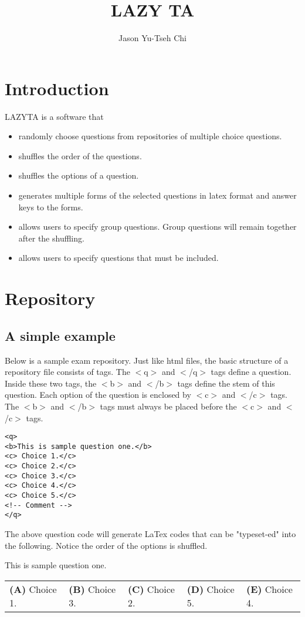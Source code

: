 \documentclass[11pt,letterpaper]{article}
\title{LAZY TA}
\author{Jason Yu-Tseh Chi}
\begin{document}

\section{Introduction}
LAZYTA is a software that 

\begin{itemize}\itemsep0pt
\item randomly choose questions from repositories of multiple choice questions. 
\item shuffles the order of the questions. 
\item shuffles the options of a question. 
\item generates multiple forms of the selected questions in latex format and answer keys to the forms. 
\item allows users to specify group questions. Group questions will remain together after the shuffling. 
\item allows users to specify questions that must be included. 
\end{itemize}

\section{Repository}

\subsection{A simple example}
Below is a sample exam repository. Just like html files, the basic structure of a repository file consists of tags. The $<$q$>$ and $<$/q$>$ tags define a question. Inside these two tags, the $<$b$>$ and $<$/b$>$ tags define the stem of this question. Each option of the question is enclosed by $<$c$>$ and $<$/c$>$ tags. The $<$b$>$ and $<$/b$>$ tags must always be placed before the $<$c$>$ and $<$/c$>$ tags. 

\begin{verbatim}
<q> 
<b>This is sample question one.</b>
<c> Choice 1.</c>
<c> Choice 2.</c>
<c> Choice 3.</c>
<c> Choice 4.</c>
<c> Choice 5.</c>
<!-- Comment -->
</q>
\end{verbatim}

The above question code will generate LaTex codes that can be "typeset-ed" into the following. Notice the order of the options is shuffled.

\begin{enumerate}
\setlength{\itemsep}{0pt}
\setlength{\parskip}{0pt}
\setlength{\parsep}{0pt}
\item This is sample question one.\\
    \begin{tabular}{l l l l l}
        \textsf{\textbf{(A)} Choice 1.}&
        \textsf{\textbf{(B)} Choice 3.}&
        \textsf{\textbf{(C)} Choice 2.}&
        \textsf{\textbf{(D)} Choice 5.}&
        \textsf{\textbf{(E)} Choice 4.}\\
    \end{tabular}\\
\end{enumerate}
\end{document}

